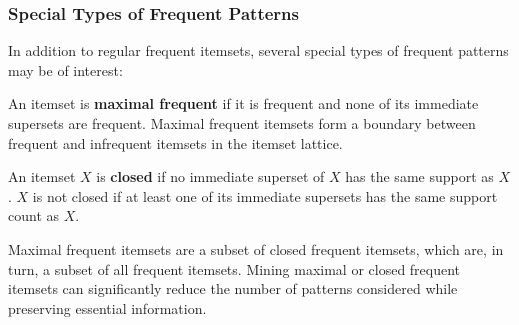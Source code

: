 \subsubsection{Special Types of Frequent Patterns}

In addition to regular frequent itemsets, several special types of frequent patterns may be of interest:

\begin{definition}
An itemset is \textbf{maximal frequent} if it is frequent and none of its immediate supersets are frequent. Maximal frequent itemsets form a boundary between frequent and infrequent itemsets in the itemset lattice.
\end{definition}

\begin{definition}
An itemset $X$ is \textbf{closed} if no immediate superset of $X$ has the same support as $X$. $X$ is not closed if at least one of its immediate supersets has the same support count as $X$.
\end{definition}

Maximal frequent itemsets are a subset of closed frequent itemsets, which are, in turn, a subset of all frequent itemsets. Mining maximal or closed frequent itemsets can significantly reduce the number of patterns considered while preserving essential information.
